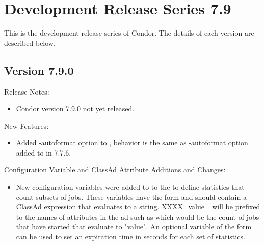 
\section{\label{sec:History-7-9}Development Release Series 7.9}

This is the development release series of Condor.
The details of each version are described below.

\subsection*{\label{sec:New-7-9-0}Version 7.9.0}

\noindent Release Notes:

\begin{itemize}

\item Condor version 7.9.0 not yet released.

\end{itemize}


\noindent New Features:

\begin{itemize}

\item Added -autoformat option to , behavior is the same as -autoformat option
added to  in 7.7.6.

\end{itemize}

\noindent Configuration Variable and ClassAd Attribute Additions and Changes:

\begin{itemize}

\item New configuration variables were added to to the  to
define statistics that count subsets of jobs. These variables
have the form  and should contain
a ClassAd expression that evaluates to a string.
XXXX_value_ will be prefixed to the names of attributes in the  ad
such as  which would be the count of jobs that have
started that evaluate to "value".  An optional variable of the form
 can be used to set an expiration time in seconds
for each set of statistics.

\end{itemize}

